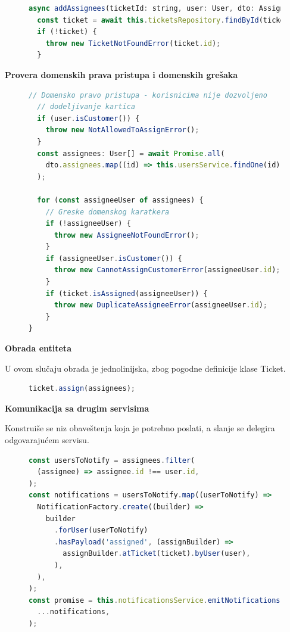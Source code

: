 \documentclass[12pt,oneside]{memoir}
\begin{document}
\begin{figure}[h]
\begin{lstlisting}[language=JavaScript, style=ES6, caption={Korak dohvatanja kartice.}]
async addAssignees(ticketId: string, user: User, dto: AssignDTO) {
  const ticket = await this.ticketsRepository.findById(ticketId);
  if (!ticket) {
    throw new TicketNotFoundError(ticket.id);
  }
\end{lstlisting}
\end{figure}

\textbf{Provera domenskih prava pristupa i domenskih grešaka}
\begin{figure}[h]
\begin{lstlisting}[language=JavaScript, style=ES6, caption={Korak provere domenskih prava pristupa i domenskih grešaka.}]
  // Domensko pravo pristupa - korisnicima nije dozvoljeno
  // dodeljivanje kartica
  if (user.isCustomer()) {
    throw new NotAllowedToAssignError();
  }
  const assignees: User[] = await Promise.all(
    dto.assignees.map((id) => this.usersService.findOne(id)),
  );

  for (const assigneeUser of assignees) {
    // Greske domenskog karatkera
    if (!assigneeUser) {
      throw new AssigneeNotFoundError();
    }
    if (assigneeUser.isCustomer()) {
      throw new CannotAssignCustomerError(assigneeUser.id);
    }
    if (ticket.isAssigned(assigneeUser)) {
      throw new DuplicateAssigneeError(assigneeUser.id);
    }
}
\end{lstlisting}
\end{figure}

\newpage
\textbf{Obrada entiteta}

U ovom slučaju obrada je jednolinijska, zbog pogodne definicije klase Ticket.
\begin{figure}[h]
\begin{lstlisting}[language=JavaScript, style=ES6, caption={Korak obrade entiteta.}]
ticket.assign(assignees);
\end{lstlisting}
\end{figure}

\textbf{Komunikacija sa drugim servisima}

Konstruiše se niz obaveštenja koja je potrebno poslati, a slanje se delegira odgovarajućem servisu.
\begin{figure}[h]
\begin{lstlisting}[language=JavaScript, style=ES6, caption={Korak komunikacije sa drugim servisima.}]
const usersToNotify = assignees.filter(
  (assignee) => assignee.id !== user.id,
);
const notifications = usersToNotify.map((userToNotify) =>
  NotificationFactory.create((builder) =>
    builder
      .forUser(userToNotify)
      .hasPayload('assigned', (assignBuilder) =>
        assignBuilder.atTicket(ticket).byUser(user),
      ),
  ),
);
const promise = this.notificationsService.emitNotifications(
  ...notifications,
);
\end{lstlisting}
\end{figure}
\end{document}
